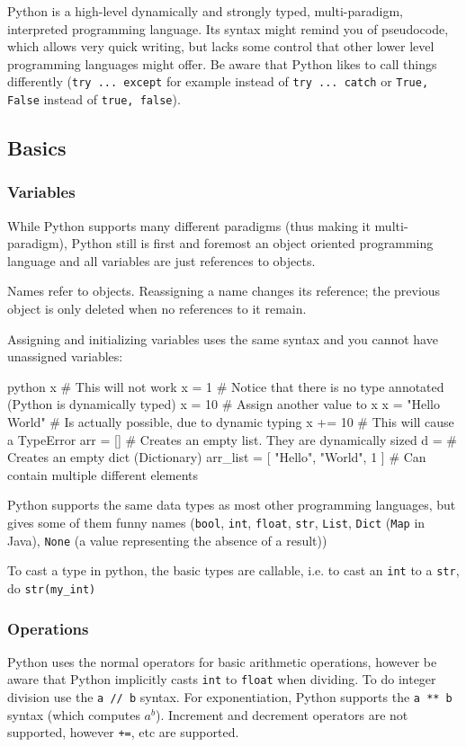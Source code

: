 Python is a high-level dynamically and strongly typed, multi-paradigm, interpreted programming language.
Its syntax might remind you of pseudocode, which allows very quick writing, but lacks some control that other lower level programming languages might offer.
Be aware that Python likes to call things differently (\texttt{try ... except} for example instead of \texttt{try ... catch} or \texttt{True, False} instead of \texttt{true, false}).

\subsection{Basics}
\subsubsection{Variables}
While Python supports many different paradigms (thus making it multi-paradigm), Python still is first and foremost an object oriented programming language and all variables
are just references to objects.

Names refer to objects. Reassigning a name changes its reference; the previous object is only deleted when no references to it remain.

Assigning and initializing variables uses the same syntax and you cannot have unassigned variables:
\begin{code}{python}
    x # This will not work
    x = 1 # Notice that there is no type annotated (Python is dynamically typed)
    x = 10 # Assign another value to x
    x = "Hello World" # Is actually possible, due to dynamic typing
    x += 10 # This will cause a TypeError
    arr = [] # Creates an empty list. They are dynamically sized
    d = {} # Creates an empty dict (Dictionary)
    arr_list = [ "Hello", "World", 1 ] # Can contain multiple different elements
\end{code}
Python supports the same data types as most other programming languages,
but gives some of them funny names (\texttt{bool}, \texttt{int}, \texttt{float}, \texttt{str}, \texttt{List}, \texttt{Dict} (\texttt{Map} in Java),
\texttt{None} (a value representing the absence of a result))

To cast a type in python, the basic types are callable, i.e. to cast an \texttt{int} to a \texttt{str}, do \texttt{str(my\_int)}


\subsubsection{Operations}
Python uses the normal operators for basic arithmetic operations, however be aware that Python implicitly casts \texttt{int} to \texttt{float} when dividing.
To do integer division use the \texttt{a // b} syntax. For exponentiation, Python supports the \texttt{a ** b} syntax (which computes $a^b$).
Increment and decrement operators are not supported, however \texttt{+=}, etc are supported.



